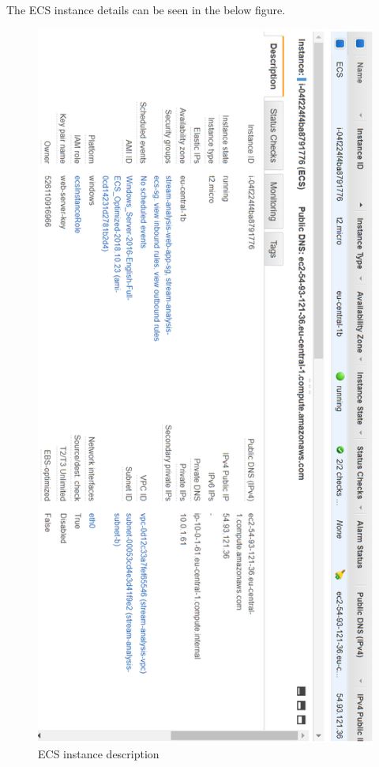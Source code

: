 The ECS instance details can be seen in the below figure.

\begin{figure}[p]
	\centering
	\noindent
	\includegraphics[width=0.5\paperwidth]{./images/aws_resources/ECS.PNG}
	\caption{ECS instance description}
	\label{fig:ecs}
\end{figure}

